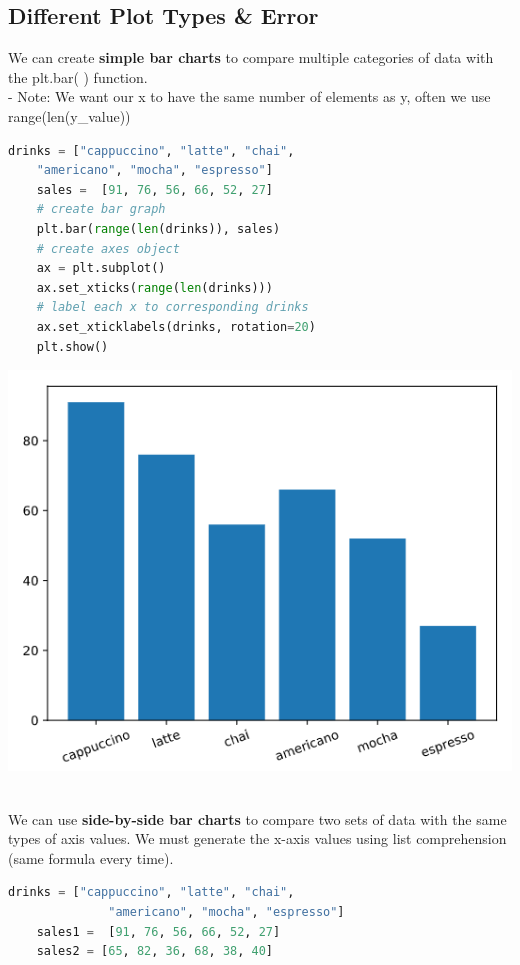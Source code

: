 \documentclass[11pt, a4paper]{article}
\begin{document}
\begin{spacing}{1.1}
	\subsection{Different Plot Types \& Error}
	We can create \textbf{simple bar charts} to compare multiple categories of data with the plt.bar( ) function.\\
	\hspace*{3mm} - Note: We want our x to have the same number of elements as y, often we use range(len(y\_value))
	\begin{minipage}[c]{9cm}
	\begin{lstlisting}[language=Python]
	drinks = ["cappuccino", "latte", "chai", 
	"americano", "mocha", "espresso"]
	sales =  [91, 76, 56, 66, 52, 27]
	# create bar graph
	plt.bar(range(len(drinks)), sales) 
	# create axes object
	ax = plt.subplot()
	ax.set_xticks(range(len(drinks)))
	# label each x to corresponding drinks
	ax.set_xticklabels(drinks, rotation=20)	
	plt.show() \end{lstlisting}\vspace*{1mm}
	\end{minipage}
	\begin{minipage}[c]{8cm}
	\includegraphics[scale=.5]{barchart}
	\end{minipage} \vspace*{1mm} \\
	We can use \textbf{side-by-side bar charts} to compare two sets of data with the same types of axis values. We must generate the x-axis values using list comprehension (same formula every time). \\
	\begin{minipage}[c]{9.2cm}
	\begin{lstlisting}[language=Python]
	drinks = ["cappuccino", "latte", "chai", 
	          "americano", "mocha", "espresso"]
	sales1 =  [91, 76, 56, 66, 52, 27]
	sales2 = [65, 82, 36, 68, 38, 40]
		

\end{lstlisting}
\end{minipage}
\end{spacing}
\end{document}
